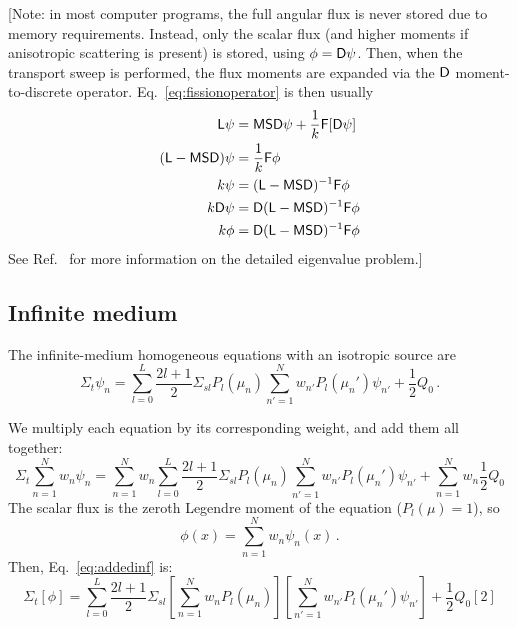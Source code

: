 \documentclass[]{SRJcommon}
\begin{document}
[Note: in most computer programs, the full angular flux is never stored due to
memory requirements. Instead, only the scalar flux (and higher moments if
anisotropic scattering is present) is stored, using $\phi = \mathsf{D} \psi$. Then,
when the transport sweep is performed, the flux moments are expanded via the
$\mathsf{D}$ moment-to-discrete operator. Eq.~\eqref{eq:fissionoperator} is then
usually
\begin{align*}
\mathsf{L} \psi &= \mathsf{M} \mathsf{S} \mathsf{D} \psi +  \frac{1}{k} \mathsf{F} [\mathsf{D} \psi]
\\
( \mathsf{L} -  \mathsf{M} \mathsf{S} \mathsf{D} ) \psi &=  \frac{1}{k} \mathsf{F} \phi
\\
k \psi &=  ( \mathsf{L} - \mathsf{M} \mathsf{S} \mathsf{D} ) ^{-1} \mathsf{F} \phi
\\
k \mathsf{D} \psi &= \mathsf{D}  ( \mathsf{L} - \mathsf{M} \mathsf{S} \mathsf{D} ) ^{-1} \mathsf{F} \phi
\\
k \phi &= \mathsf{D} ( \mathsf{L} - \mathsf{M} \mathsf{S} \mathsf{D} ) ^{-1} \mathsf{F} \phi
\end{align*}
See Ref.~\cite{War2004a} for more information on the detailed eigenvalue
problem.]

\subsection{Infinite medium}
The infinite-medium homogeneous \SN{} equations with an isotropic source are
$$\Sigma_t \psi_n 
= \sum_{l=0}^{L}  \frac{2l+1}{2} \Sigma_{sl} P_{l}(\mu_n)
  \sum_{n'=1}^{N} w_{n'} P_{l} (\mu_n') \psi_{n'}
  + \frac{1}{2} Q_0 \,.$$

We multiply each equation by its corresponding weight, and add them all
together:
\begin{equation}
\Sigma_t \sum_{n=1}^{N} w_{n} \psi_{n} 
= \sum_{n=1}^{N} w_{n} \sum_{l=0}^{L}  \frac{2l+1}{2} \Sigma_{sl} P_{l}(\mu_n)
  \sum_{n'=1}^{N} w_{n'} P_{l} (\mu_n') \psi_{n'}
  + \sum_{n=1}^{N} w_{n} \frac{1}{2} Q_0
  \label{eq:addedinf}
\end{equation}
The scalar flux is the zeroth Legendre moment of the equation ($P_l(\mu) = 1$),
so
$$ \phi(x) = \sum_{n=1}^{N} w_{n} \psi_{n}(x) \,.$$
Then, Eq.~\eqref{eq:addedinf} is:
$$ \Sigma_t [\phi] 
= \sum_{l=0}^{L}  \frac{2l+1}{2} \Sigma_{sl} \left[ \sum_{n=1}^{N} w_{n}
P_{l}(\mu_n) \right] \left[ \sum_{n'=1}^{N} w_{n'} P_{l} (\mu_n') \psi_{n'}
\right] + \frac{1}{2} Q_0 [2] $$
\end{document}
